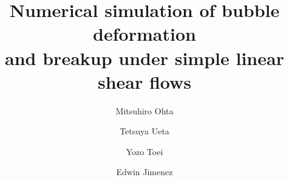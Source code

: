 \documentclass{elsarticle}
\begin{document}
\begin{frontmatter}



\title{Numerical simulation of bubble deformation \\
       and breakup under simple linear shear flows}

\author[1,2]{Mitsuhiro Ohta} 

\author[2]{Tetsuya Ueta}
\author[3]{Yozo Toei}

\author[4]{Edwin Jimenez}  

\end{frontmatter}
\end{document}
